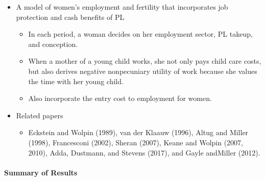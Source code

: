 \documentclass[../root]{subfiles}
\begin{document}
    \begin{itemize}
      \item A model of women’s employment and fertility that incorporates job protection and cash benefits of PL
      \begin{itemize}
        \item In each period, a woman decides on her employment sector, PL takeup, and conception.
        \item When a mother of a young child works, she not only pays child care costs, but also derives negative nonpecuniary utility of work because she values the time with her young child.
        \item Also incorporate the entry cost to employment for women.
      \end{itemize}
      \item Related papers
      \begin{itemize}
        \item Eckstein and Wolpin (1989), van der Klaauw (1996), Altug and Miller (1998), Francesconi (2002), Sheran (2007), Keane and Wolpin (2007, 2010), Adda, Dustmann, and Stevens (2017), and Gayle andMiller (2012).
      \end{itemize}
    \end{itemize}

    \paragraph{Summary of Results}
\end{document}

